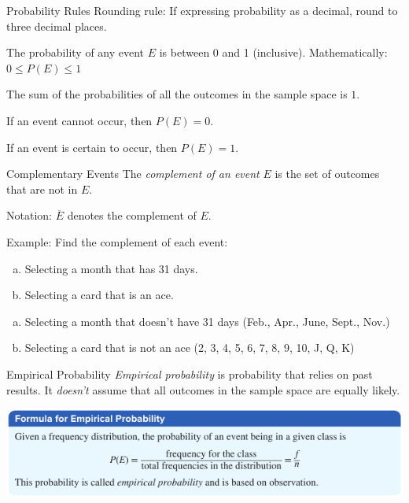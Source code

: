 \documentclass[t, aspectratio=169]{beamer}
\newcommand{\?}{\stackrel{?}{=}}
\begin{document}
	\begin{frame}{Probability Rules}
		Rounding rule: If expressing probability as a decimal, round to three decimal places. \pause
		
		The probability of any event $E$ is between 0 and 1 (inclusive). Mathematically: $0 \leq P(E) \leq 1$ \pause
		
		The sum of the probabilities of all the outcomes in the sample space is $1$.
		
		If an event cannot occur, then $P(E) = 0$. \pause
		
		If an event is certain to occur, then $P(E) = 1$.
	\end{frame}

	\begin{frame}{Complementary Events}
		The \textit{complement of an event} $E$ is the set of outcomes that are not in $E$.
		
		Notation: $\overline{E}$ denotes the complement of $E$. \pause
		
		Example: Find the complement of each event: \begin{enumerate}[a)]
			\item Selecting a month that has 31 days.
			\item Selecting a card that is an ace.
		\end{enumerate} \pause
		\begin{enumerate}[a)]
			\item Selecting a month that doesn't have 31 days (Feb., Apr., June, Sept., Nov.) \pause
			\item Selecting a card that is not an ace (2, 3, 4, 5, 6, 7, 8, 9, 10, J, Q, K)
		\end{enumerate}
	\end{frame}

	\begin{frame}{Empirical Probability}
		\textit{Empirical probability} is probability that relies on past results. It \textit{doesn't} assume that all outcomes in the sample space are equally likely. \pause
		
		\includegraphics[width=\textwidth]{empirical.png}
	\end{frame}
\end{document}
